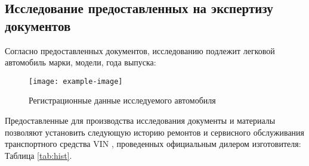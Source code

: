 \subsection{Исследование предоставленных на экспертизу документов}
%
Согласно предоставленных документов,  исследованию подлежит легковой автомобиль  марки, модели, года выпуска:
\begin{figure}[H]
	\centering
	\texttt{[image: example-image]}
	\caption{Регистрационные данные исследуемого автомобиля}
\end{figure}


%
Предоставленные для производства исследования документы и материалы позволяют установить следующую историю ремонтов и сервисного обслуживания  транспортного средства VIN \vin, проведенных официальным дилером изготовителя: Таблица \ref{tab:hist}.
%		
%		
%		
